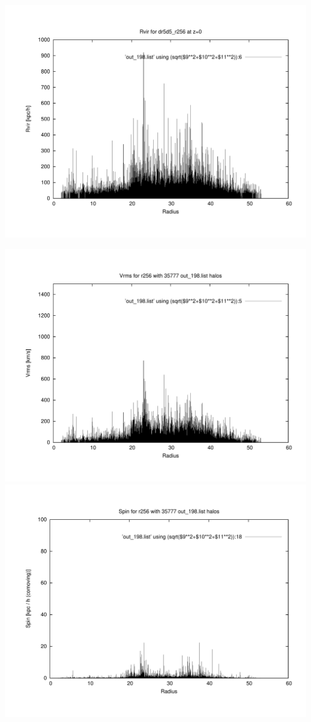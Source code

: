 \includegraphics[scale=0.3]{dr5d5_r256/plot_rvir_z0.pdf}

\includegraphics[scale=0.3]{dr5d5_r256/plot_Vrms_out_198.pdf}
\includegraphics[scale=0.3]{dr5d5_r256/plot_spin_out_198.pdf}

